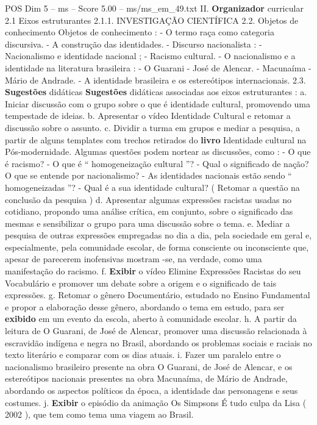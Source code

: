 \begin{textsample}{POS Dim 5 – ms – Score 5.00 – ms/ms\_em\_49.txt}  \label{ex:f5_pos_217}
II. \textbf{Organizador} curricular 2.1 Eixos estruturantes 2.1.1.
INVESTIGAÇÃO CIENTÍFICA 2.2.
Objetos de conhecimento Objetos de conhecimento : - O termo raça como categoria discursiva. - A construção das identidades. - Discurso nacionalista : - Nacionalismo e identidade nacional ; - Racismo cultural. - O nacionalismo e a identidade na literatura brasileira : - O Guarani - José de Alencar. - Macunaíma - Mário de Andrade. - A identidade brasileira e os estereótipos internacionais. 2.3. \textbf{Sugestões} didáticas \textbf{Sugestões} didáticas associadas aos eixos estruturantes : a.
Iniciar discussão com o grupo sobre o que é identidade cultural, promovendo uma tempestade de ideias. b.
Apresentar o vídeo Identidade Cultural e retomar a discussão sobre o assunto. c.
Dividir a turma em grupos e mediar a pesquisa, a partir de alguns templates com trechos retirados do \textbf{livro} Identidade cultural na Pós-modernidade.
Algumas questões podem nortear as discussões, como : - O que é racismo? - O que é “ homogeneização cultural ”? - Qual o significado de nação?
O que se entende por nacionalismo? - As identidades nacionais estão sendo “ homogeneizadas ”? - Qual é a sua identidade cultural? ( Retomar a questão na conclusão da pesquisa ) d.
Apresentar algumas expressões racistas usadas no cotidiano, propondo uma análise crítica, em conjunto, sobre o significado das mesmas e sensibilizar o grupo para uma discussão sobre o tema. e.
Mediar a pesquisa de outras expressões empregadas no dia a dia, pela sociedade em geral e, especialmente, pela comunidade escolar, de forma consciente ou inconsciente que, apesar de parecerem inofensivas mostram -se, na verdade, como uma manifestação do racismo. f. \textbf{Exibir} o vídeo Elimine Expressões Racistas do seu Vocabulário e promover um debate sobre a origem e o significado de tais expressões. g.
Retomar o gênero Documentário, estudado no Ensino Fundamental e propor a elaboração desse gênero, abordando o tema em estudo, para ser \textbf{exibido} em um evento da escola, aberto à comunidade escolar. h.
A partir da leitura de O Guarani, de José de Alencar, promover uma discussão relacionada à escravidão indígena e negra no Brasil, abordando os problemas sociais e raciais no texto literário e comparar com os dias atuais. i.
Fazer um paralelo entre o nacionalismo brasileiro presente na obra O Guarani, de José de Alencar, e os estereótipos nacionais presentes na obra Macunaíma, de Mário de Andrade, abordando os aspectos políticos da época, a identidade das personagens e seus costumes. j. \textbf{Exibir} o episódio da animação Os Simpsons É tudo culpa da Lisa ( 2002 ), que tem como tema uma viagem ao Brasil.

\end{textsample}
